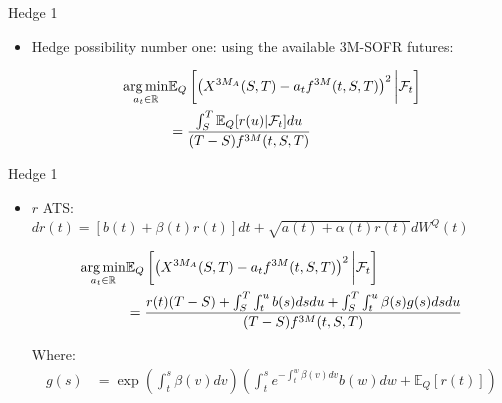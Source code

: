 \documentclass[UKenglish]{beamer}
\newcommand{\E}{\mathbb{E}}  %
\newcommand{\F}{\mathcal{F}} %
\newcommand{\R}{\mathbb{R}}  %
\begin{document}
\begin{frame}{Hedge 1}
\begin{itemize}
    \item Hedge possibility number one: using the available 3M-SOFR futures: 

\begin{proposition}
\begin{align*}
\underset{a_{t}\in \R}{\arg\min}
&\E_{Q}\left[
\left(
X^{3M_{A}}(S,T)-a_{t}f^{3M}(t,S,T)
\right)^{2}
\bigg{|}\F_{t}
\right] \\ 
&= \frac{
\int_{S}^{T}\E_{Q}[r(u)|\F_{t}]du
}{
(T-S)f^{3M}(t,S,T)
}      
\end{align*}
\end{proposition}

\end{itemize}
\end{frame}


\begin{frame}{Hedge 1}
\begin{itemize}
    \item $r$ ATS: $dr(t) = [b(t) + \beta(t)r(t)]dt + \sqrt{a(t) + \alpha(t)r(t)}dW^{Q}(t)$ 

\begin{proposition}   
\begin{align*}
\underset{a_{t}\in \R}{\arg\min}
&\E_{Q}\left[
\left(
X^{3M_{A}}(S,T)-a_{t}f^{3M}(t,S,T)
\right)^{2}
\bigg{|}\F_{t}
\right] \\ 
&= 
\frac{
r(t)(T-S)
+ \int_{S}^{T}\int_{t}^{u}b(s)dsdu 
+ \int_{S}^{T}\int_{t}^{u}\beta(s)g(s)dsdu
}{
(T-S)f^{3M}(t,S,T)
}
\end{align*}

Where: 
\begin{align*}
g(s) &= \exp\left(
\int_{t}^{s}\beta(v)dv
\right)
\left(
\int_{t}^{s}e^{-\int_{t}^{w}\beta(v)dv}b(w)dw + \E_{Q}[r(t)]
\right) 
\end{align*}
\end{proposition} 

\end{itemize}
\end{frame}
\end{document}

